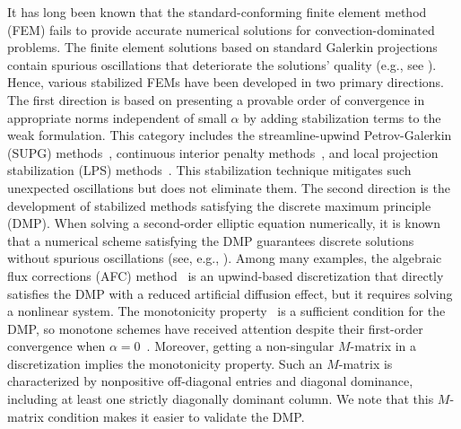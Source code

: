 \documentclass[a4paper]{article}
\theoremstyle{plain}
\theoremstyle{definition}
\numberwithin{equation}{section}
\begin{document}
It has long been known that the standard-conforming finite element method (FEM) fails to provide accurate numerical solutions for convection-dominated problems.
The finite element solutions based on standard Galerkin projections contain spurious oscillations that deteriorate the solutions' quality (e.g., see \cite{1977Kikuchi,ELM05,STY05,2007JohnKnobloch}).
Hence, various stabilized FEMs have been developed in two primary directions.
The first direction is based on presenting a provable order of convergence in appropriate norms independent of small $\alpha$ by adding stabilization terms to the weak formulation.
This category includes the streamline-upwind Petrov-Galerkin (SUPG) methods~\cite{BRO82}, continuous interior penalty methods~\cite{BUR04}, and local projection stabilization (LPS) methods~\cite{KNO10}.
This stabilization technique mitigates such unexpected oscillations but does not eliminate them.
The second direction is the development of stabilized methods satisfying the discrete maximum principle (DMP).
When solving a second-order elliptic equation numerically, it is known that a numerical scheme satisfying the DMP guarantees discrete solutions without spurious oscillations (see, e.g., \cite{1973CiarletRaviart,2005BurmanErn,2008Roos}).
Among many examples, the algebraic flux corrections (AFC) method~\cite{BAR18} is an upwind-based discretization that directly satisfies the DMP with a reduced artificial diffusion effect, but it requires solving a nonlinear system.
The monotonicity property~\cite{gilbarg1977elliptic} is a sufficient condition for the DMP, so monotone schemes have received attention despite their first-order convergence when $\alpha=0$~\cite{godunov1959difference}.
Moreover, getting a non-singular $M$-matrix in a discretization implies the monotonicity property. 
Such an $M$-matrix is characterized by nonpositive off-diagonal entries and diagonal dominance, including at least one strictly diagonally dominant column.
We note that this $M$-matrix condition makes it easier to validate the DMP.
\end{document}
